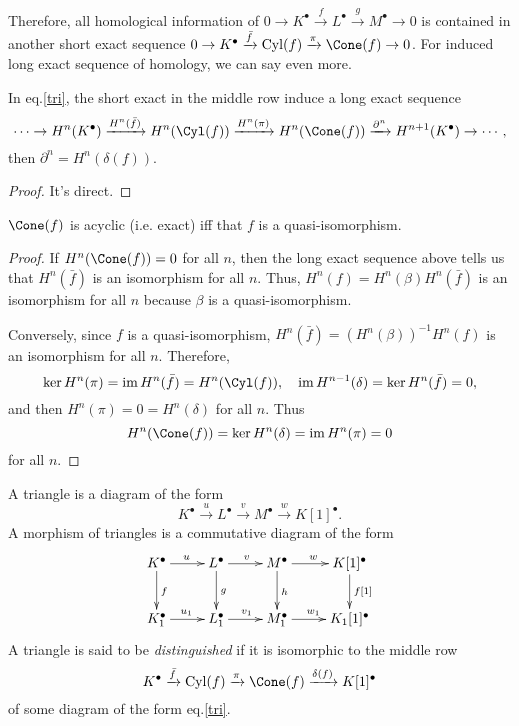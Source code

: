 Therefore, all homological information of $0\to K^\bullet \xrightarrow{f}L^\bullet \xrightarrow{g}M^\bullet\to 0$ is contained in another short exact sequence $0\to K^\bullet \xrightarrow{\bar f}\operatorname{Cyl}(f) \xrightarrow{\pi}\Cone(f)\to 0$. For induced long exact sequence of homology, we can say even more.

\begin{lem}\label{lem:1.14}
	In eq.\eqref{tri}, the short exact in the middle row induce a long exact sequence
	\[
		\cdots\to H^n(K^\bullet)\xrightarrow{H^n(\bar f)}H^n(\Cyl(f))\xrightarrow{H^n(\pi)}H^n(\Cone(f))\xrightarrow{\partial^n}H^{n+1}(K^\bullet)\to\cdots,
	\]
	then $\partial^n=H^n(\delta(f))$.
\end{lem}

\begin{proof}
	It's direct.
\end{proof}

\begin{coro}
	$\Cone(f)$ is acyclic (i.e. exact) iff that $f$ is a quasi-isomorphism.
\end{coro}

\begin{proof}
	If $H^n(\Cone(f))=0$ for all $n$, then the long exact sequence above tells us that $H^n(\bar f)$ is an isomorphism for all $n$. Thus, $H^n(f)=H^n(\beta)H^n(\bar f)$ is an isomorphism for all $n$ because $\beta$ is a quasi-isomorphism.

	Conversely, since $f$ is a quasi-isomorphism, $H^n(\bar f)=(H^n(\beta))^{-1}H^n(f)$ is an isomorphism for all $n$. Therefore, 
	\[
		\ker H^n(\pi)=\im H^n(\bar f)=H^n(\Cyl(f)),\quad 
		\im H^{n-1}(\delta)=\ker H^n(\bar f)=0,
	\]
	and then $H^n(\pi)=0=H^{n}(\delta)$ for all $n$. Thus 
	\[
		H^n(\Cone(f))=\ker H^n(\delta)=\im H^n(\pi)=0
	\]
	for all $n$.
\end{proof}

\begin{definition}
	A triangle is a diagram of the form
	\[
		K^\bullet \xrightarrow{u}L^\bullet\xrightarrow{v}M^\bullet 
		\xrightarrow{w}K[1]^\bullet.
	\]
	A morphism of triangles is a commutative diagram of the form
	\[
		\xymatrix{
		K^\bullet \ar@{->}[r]^{u} \ar@{->}[d]^{f} & L^\bullet \ar@{->}[r]^{v} \ar@{->}[d]^{g} & M^\bullet \ar@{->}[r]^{w} \ar@{->}[d]^{h} & K[1]^\bullet \ar@{->}[d]^{{f[1]}} \\
		K_1^\bullet \ar@{->}[r]^{u_1} & L_1^\bullet \ar@{->}[r]^{v_1} & M_1^\bullet \ar@{->}[r]^{w_1} & K_1[1]^\bullet
		}
	\]
	A triangle is said to be \textit{distinguished} if it is isomorphic to the middle row 
	\[
		K^\bullet \xrightarrow{\bar f}\operatorname{Cyl}(f) \xrightarrow{\pi}\Cone(f)\xrightarrow{\delta(f)}K[1]^\bullet
	\]
	of some diagram of the form eq.\eqref{tri}.
\end{definition}

